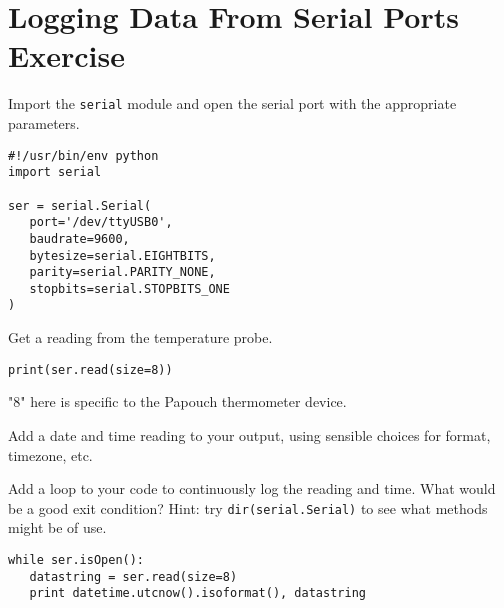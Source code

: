\documentclass[a4paper,11pt]{article}
\begin{document}
\section{Logging Data From Serial Ports Exercise}

\begin{question}
Import the \texttt{serial} module and 
open the serial port with the appropriate parameters.
\end{question}
\newsavebox\serbasic
\begin{lrbox}{\serbasic}
\begin{minipage}{\textwidth}
\begin{verbatim}
#!/usr/bin/env python
import serial

ser = serial.Serial(
   port='/dev/ttyUSB0',
   baudrate=9600,
   bytesize=serial.EIGHTBITS,
   parity=serial.PARITY_NONE,
   stopbits=serial.STOPBITS_ONE
)
\end{verbatim}
\end{minipage}
\end{lrbox}


\begin{solution}
\noindent\usebox\serbasic
\end{solution}
\begin{question}
Get a reading from the temperature probe.
\end{question}
\begin{solution}
\texttt{print(ser.read(size=8))}
\par
"8" here is specific to the Papouch thermometer device.
\end{solution}
\begin{question}
Add a date and time reading to your output, using sensible choices for 
format, timezone, etc.
\end{question}
\begin{question}
Add a loop to your code to continuously log the reading and time. What would be a good exit condition? Hint: try \texttt{dir(serial.Serial)} to see what methods 
might be of use.
\end{question}
\newsavebox\serloop
\begin{lrbox}{\serloop}
\begin{minipage}{\textwidth}
\begin{verbatim}
while ser.isOpen():
   datastring = ser.read(size=8)
   print datetime.utcnow().isoformat(), datastring
\end{verbatim}
\end{minipage}
\end{lrbox}
\end{document}
